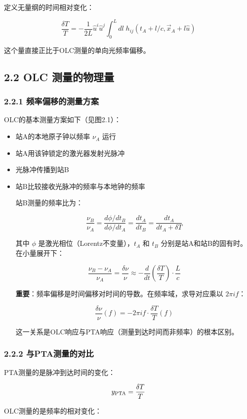\documentclass[12pt,a4paper]{article}
\begin{document}
定义无量纲的时间相对变化：

$$\frac{\delta T}{T} = -\frac{1}{2L} \hat{u}^i \hat{u}^j \int_0^L dl\; h_{ij}(t_A + l/c, \vec{x}_A + l\hat{u})$$

这个量直接正比于OLC测量的单向光频率偏移。

\subsection{2.2 OLC 测量的物理量}


\subsubsection{2.2.1 频率偏移的测量方案}


OLC的基本测量方案如下（见图2.1）：

\begin{itemize}
  \item[1] 站A的本地原子钟以频率 $\nu_A$ 运行
  \item[2] 站A用该钟锁定的激光器发射光脉冲
  \item[3] 光脉冲传播到站B
  \item[4] 站B比较接收光脉冲的频率与本地钟的频率

站B测量的频率比为：

$$\frac{\nu_B}{\nu_A} = \frac{d\phi/dt_B}{d\phi/dt_A} = \frac{dt_A}{dt_B} = \frac{dt_A}{dt_A + \delta T}$$

其中 $\phi$ 是激光相位（Lorentz不变量），$t_A$ 和 $t_B$ 分别是站A和站B的固有时。在小量展开下：

$$\frac{\nu_B - \nu_A}{\nu_A} = \frac{\delta\nu}{\nu} \approx -\frac{d}{dt}\left(\frac{\delta T}{T}\right) \cdot \frac{L}{c}$$

\textbf{重要}：频率偏移是时间偏移对时间的导数。在频率域，求导对应乘以 $2\pi i f$：

$$\frac{\delta\nu}{\nu}(f) = -2\pi i f \cdot \frac{\delta T}{T}(f)$$

这一关系是OLC响应与PTA响应（测量到达时间而非频率）的根本区别。

\end{itemize}
\subsubsection{2.2.2 与PTA测量的对比}


PTA测量的是脉冲到达时间的变化：

$$y_{\rm PTA} = \frac{\delta T}{T}$$

OLC测量的是频率的相对变化：
\end{document}
